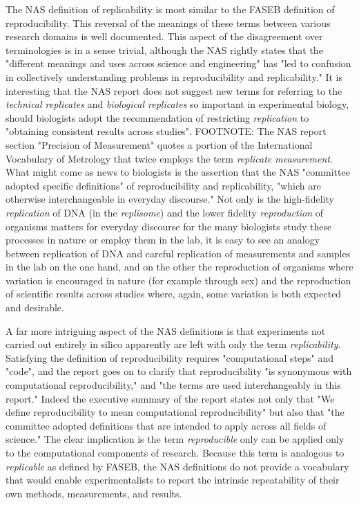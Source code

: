 The NAS definition of replicability is most similar to the FASEB definition of reproducibility.
This reversal of the meanings of these terms between various research domains is well documented.
This aspect of the disagreement over terminologies is in a sense trivial, although the NAS rightly 
	states that the "different meanings and uses across science and engineering" has "led to confusion in collectively 
	understanding problems in reproducibility and replicability."
It is interesting that the NAS report does not suggest new terms for referring to the \emph{technical replicates} 
	and  \emph{biological replicates} so important in experimental biology, should biologists adopt the recommendation 
	of restricting \emph{replication} to "obtaining consistent results across studies".
FOOTNOTE: The NAS report section "Precision of Measurement" quotes a portion of the International Vocabulary of
	Metrology that twice employs the term \emph{replicate measurement}.
What might come as news to biologists is the assertion that the NAS "committee adopted specific definitions" of 
	reproducibility and replicability, "which are otherwise interchangeable in everyday discourse."
Not only is the high-fidelity \emph{replication} of DNA (in the \emph{replisome}) and the lower fidelity \emph{reproduction}
	of organisms  matters for everyday discourse for the many biologists study these processes in nature or employ them in the lab,
	it is easy to see an analogy between replication of DNA and careful replication of measurements and samples
	in the lab on the one hand, and on the other the reproduction of organisms where variation is encouraged in nature
	(for example through sex) and the reproduction of scientific results across studies where, again, some variation is both 
	expected and desirable.

A far more intriguing aspect of the NAS definitions is that experiments not carried out entirely in silico apparently are 
	left with only the term \emph{replicability}.
Satisfying the definition of reproducibility requires "computational steps" and "code", and the report goes on to clarify 
	that reproducibility "is synonymous with computational reproducibility,"  and "the terms are used interchangeably in this report."
Indeed the executive summary of the report states not only that "We define reproducibility to mean computational reproducibility" 
	but also that "the committee adopted definitions that are intended to apply across all fields of science."
The clear implication is the term \emph{reproducible} only can be applied only to the computational components of research.
Because this term is analogous to \emph{replicable} as defined by FASEB, the NAS definitions do not provide a vocabulary 
	that would enable experimentalists to report the intrinsic repeatability of their own methods, measurements, and results. 

